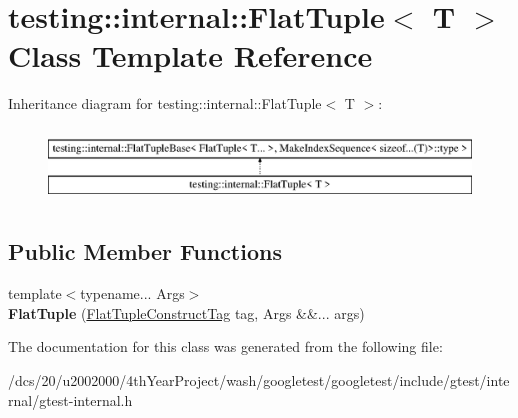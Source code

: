 \hypertarget{classtesting_1_1internal_1_1FlatTuple}{}\section{testing\+:\+:internal\+:\+:Flat\+Tuple$<$ T $>$ Class Template Reference}
\label{classtesting_1_1internal_1_1FlatTuple}
Inheritance diagram for testing\+:\+:internal\+:\+:Flat\+Tuple$<$ T $>$\+:\begin{figure}[H]
\begin{center}
\leavevmode
\includegraphics[height=2.000000cm]{classtesting_1_1internal_1_1FlatTuple}
\end{center}
\end{figure}
\subsection*{Public Member Functions}
\begin{DoxyCompactItemize}
\item 
\mbox{\label{classtesting_1_1internal_1_1FlatTuple_a6909f134c4128b1b6fb2dcc4db5d856f}} 
{\footnotesize template$<$typename... Args$>$ }\\{\bfseries Flat\+Tuple} (\mbox{\hyperlink{structtesting_1_1internal_1_1FlatTupleConstructTag}{Flat\+Tuple\+Construct\+Tag}} tag, Args \&\&... args)
\end{DoxyCompactItemize}


The documentation for this class was generated from the following file\+:\begin{DoxyCompactItemize}
\item 
/dcs/20/u2002000/4th\+Year\+Project/wash/googletest/googletest/include/gtest/internal/gtest-\/internal.\+h\end{DoxyCompactItemize}
